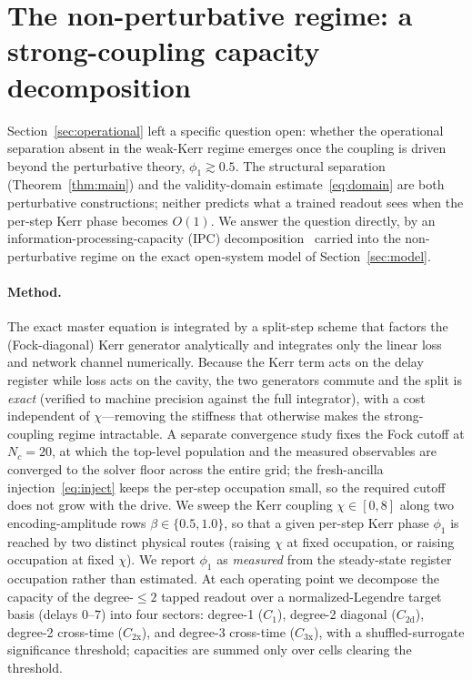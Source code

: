 \documentclass[11pt]{article}
\theoremstyle{remark}
\begin{document}
\section{The non-perturbative regime: a strong-coupling capacity decomposition}
\label{sec:strongregime}

Section~\ref{sec:operational} left a specific question open: whether the operational
separation absent in the weak-Kerr regime emerges once the coupling is driven beyond
the perturbative theory, $\phi_1\gtrsim0.5$. The structural separation
(Theorem~\ref{thm:main}) and the validity-domain estimate~\eqref{eq:domain} are both
perturbative constructions; neither predicts what a trained readout sees when the
per-step Kerr phase becomes $O(1)$. We answer the question directly, by an
information-processing-capacity (IPC) decomposition~\cite{dambre2012} carried into the
non-perturbative regime on the exact open-system model of Section~\ref{sec:model}.

\paragraph{Method.} The exact master equation is integrated by a split-step scheme
that factors the (Fock-diagonal) Kerr generator analytically and integrates only the
linear loss and network channel numerically. Because the Kerr term acts on the delay
register while loss acts on the cavity, the two generators commute and the split is
\emph{exact} (verified to machine precision against the full integrator), with a cost
independent of $\chi$---removing the stiffness that otherwise makes the strong-coupling
regime intractable. A separate convergence study fixes the Fock cutoff at $N_c=20$,
at which the top-level population and the measured observables are converged to the
solver floor across the entire grid; the fresh-ancilla injection~\eqref{eq:inject}
keeps the per-step occupation small, so the required cutoff does not grow with the
drive. We sweep the Kerr coupling $\chi\in[0,8]$ along two encoding-amplitude rows
$\beta\in\{0.5,1.0\}$, so that a given per-step Kerr phase $\phi_1$ is reached by two
distinct physical routes (raising $\chi$ at fixed occupation, or raising occupation at
fixed $\chi$). We report $\phi_1$ as \emph{measured} from the steady-state register
occupation rather than estimated. At each operating point we decompose the capacity of
the degree-$\le2$ tapped readout over a normalized-Legendre target basis (delays
$0$--$7$) into four sectors: degree-1 ($C_1$), degree-2 diagonal ($C_{2\mathrm{d}}$),
degree-2 cross-time ($C_{2\mathrm{x}}$), and degree-3 cross-time ($C_{3\mathrm{x}}$),
with a shuffled-surrogate significance threshold; capacities are summed only over
cells clearing the threshold.
\end{document}

